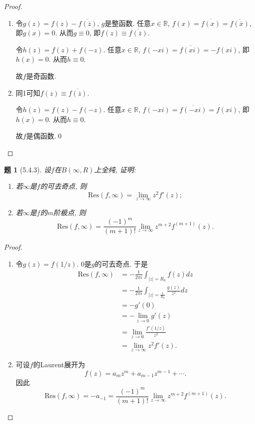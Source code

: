 \documentclass{article}[a4paper, 12pt]
\theoremstyle{mystyle}
\newtheorem{problem}{题}
\begin{document}
\begin{proof}
  \begin{enumerate}
    \item 令\(g(z)=f(z)-\overline{f(\overline z)}\), \(g\)是整函数. 任意\(x\in\mathbb R\), \(f(x)=\overline{f(x)}=\overline{f(\overline x)}\), 即\(g(x)=0\). 从而\(g\equiv 0\), 即\(f(z)\equiv\overline{f(\overline{ z})}\).
    
    令\(h(z)=f(z)+f(-z)\). 任意\(x\in\mathbb R\), \(f(-xi)=\overline{f(xi)}=-f(xi)\), 即\(h(x)=0\). 从而\(h\equiv0\). 
    
    故\(f\)是奇函数.

    \item 同1可知\(f(z)\equiv\overline{f(\overline{ z})}\).
    
    令\(h(z)=f(z)-f(-z)\). 任意\(x\in\mathbb R\), \(f(-xi)=\overline{f(-xi)}=f(xi)\), 即\(h(x)=0\). 从而\(h\equiv0\). 
    
    故\(f\)是偶函数.\qed
  \end{enumerate}
  \renewcommand{\qedsymbol}{}
\end{proof}

\begin{problem}[5.4.3]
  设\(f\)在\(B(\infty,R)\)上全纯, 证明:
  \begin{enumerate}
    \item 若\(\infty\)是\(f\)的可去奇点, 则\[\text{Res}(f,\infty)=\lim_{z\to\infty}z^2f'(z);\]
    \item 若\(\infty\)是\(f\)的\(m\)阶极点, 则\[\text{Res}(f,\infty)=\frac{(-1)^m}{(m+1)!}\lim_{z\to\infty}z^{m+2}f^{(m+1)}(z).\]
  \end{enumerate}
\end{problem}

\begin{proof}
  \begin{enumerate}
    \item 令\(g(z)=f(1/z)\). \(0\)是\(g\)的可去奇点. 于是\begin{align*}
      \text{Res}(f,\infty)&=-\frac{1}{2\pi i}\int_{|z|=R_0} f(z)dz\\
      &=-\frac{1}{2\pi i}\int_{|z|=\frac{1}{R_0}} \frac{g(z)}{z^2}dz\\
      &=-g'(0)\\
      &=-\lim_{z\to0}g'(z)\\
      &=\lim_{z\to 0}\frac{f'(1/z)}{z^2}\\
      &=\lim_{z\to\infty}z^2f'(z).
    \end{align*}
    \item 可设\(f\)的Laurent展开为\[f(z)=a_mz^m+a_{m-1}z^{m-1}+\cdots.\]
    因此\[\text{Res}(f,\infty)=-a_{-1}=\frac{(-1)^m}{(m+1)!}\lim_{z\to\infty}z^{m+2}f^{(m+1)}(z).\tag*{\(\qed\)}\]
  \end{enumerate}
  \renewcommand{\qedsymbol}{}
\end{proof}
\end{document}
